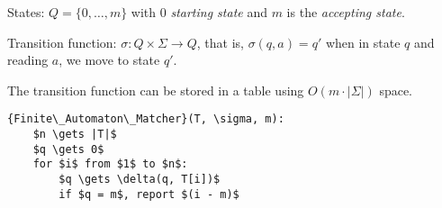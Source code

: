 \begin{mydefinition}
States: $Q = \{0, \ldots, m\}$ with $0$ \emph{starting state} and $m$ is the \emph{accepting state}.

Transition function: $\sigma: Q \times \Sigma \rightarrow Q$, that is, $\sigma(q,a) = q'$ when in state $q$ and reading $a$, we move to state $q'$.
\end{mydefinition}

The transition function can be stored in a table using $O(m \cdot |\Sigma|)$ space.

\begin{lstlisting}[mathescape]
{Finite\_Automaton\_Matcher}(T, \sigma, m):
	$n \gets |T|$
	$q \gets 0$
	for $i$ from $1$ to $n$:
		$q \gets \delta(q, T[i])$
		if $q = m$, report $(i - m)$
\end{lstlisting}
